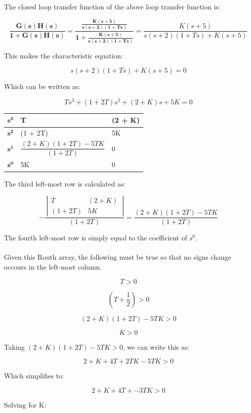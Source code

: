 \documentclass[12pt, letterpaper]{../assignment}
\begin{document}
The closed loop transfer function of the above loop transfer function is:

$$ \mathbf{ \frac{G(s)H(s)}{1 + G(s)H(s)} =
\frac{\frac{K(s+5)}{s (s+2) (1+ T s)}}{1+\frac{K(s+5)}{s (s+2) (1+ T s)}} = }
\frac{K(s+5)}{s (s+2) (1+ T s)+ K(s+5)} $$

This makes the characteristic equation:

$$ s (s+2) (1+ T s)+ K(s+5) = 0 $$

Which can be written as:

$$ Ts^3 + (1 + 2T) s^2  + (2 + K)s + 5K  = 0 $$


\begin{center}
    \begin{tabular}{ | m{2em} | m{15em}| m{15em} | } 
      \hline
      $\mathbf{s^3}$ & T & (2 + K) \\ 
      \hline
      $\mathbf{s^2}$ & (1 + 2T) & 5K \\ 
      \hline
      $\mathbf{s^1}$ & $\dfrac{(2 + K)(1 + 2T) -5TK}{(1 + 2T)}$ & 0 \\ 
      \hline
      $\mathbf{s^0}$ & 5K & 0 \\ 
      \hline
    \end{tabular}
\end{center}


The third left-most row is calculated as:

$$ - \frac{\ \left|\begin{array}{cc} T & (2 + K) \\ (1 + 2T) & 5K \end{array}\ \right|}{(1 + 2T)}
 = \dfrac{(2 + K)(1 + 2T) -5TK}{(1 + 2T)}$$

 The fourth left-most row is simply equal to the coefficient of $s^0$.
\\\\
 Given this Routh array, the following must be true so that no signs change occours in the left-most column.

 $$ T > 0 $$

 $$ (T + \frac{1}{2}) > 0 $$

 $$ (2 + K)(1 + 2T) -5TK > 0 $$

 $$ K > 0 $$ 

 Taking $ (2 + K)(1 + 2T) -5TK > 0 $, we can write this as:

 $$ 2 + K + 4T + 2TK -5TK > 0 $$

 Which simplifies to:

 $$ 2 + K + 4T + -3TK > 0 $$

 Solving for K:
\end{document}
